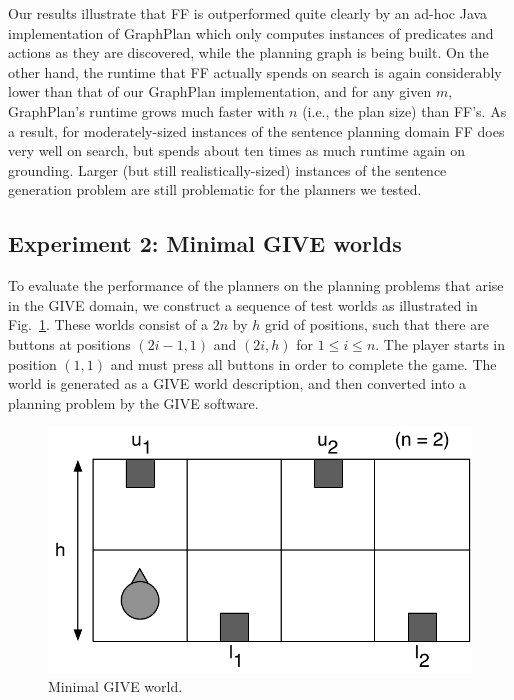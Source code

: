 Our results illustrate that FF is outperformed quite clearly by an ad-hoc
Java implementation of GraphPlan which only computes instances of
predicates and actions as they are discovered, while the planning graph is
being built. On the other hand, the runtime that FF actually spends on
search is again considerably lower than that of our GraphPlan
implementation, and for any given $m$, GraphPlan's runtime grows much
faster with $n$ (i.e., the plan size) than FF's. As a result, for
moderately-sized instances of the sentence planning domain FF does very
well on search, but spends about ten times as much runtime again on
grounding. Larger (but still realistically-sized) instances of the sentence
generation problem are still problematic for the planners we tested.



\subsection{Experiment 2: Minimal GIVE worlds}
\label{sec:exper-2:-minim}

To evaluate the performance of the planners on the planning problems
that arise in the GIVE domain, we construct a sequence of test worlds
as illustrated in Fig.~\ref{fig:give-minimal}.  These worlds consist
of a $2n$ by $h$ grid of positions, such that there are buttons at
positions $(2i-1,1)$ and $(2i,h)$ for $1 \leq i \leq n$.  The player
starts in position $(1,1)$ and must press all buttons in order to
complete the game.  The world is generated as a GIVE world
description, and then converted into a planning problem by the GIVE
software. 

\begin{figure}
  \centering
  \includegraphics[width=0.8\columnwidth]{pic-buttons}
  \caption{Minimal GIVE world.}
  \label{fig:give-minimal}
\end{figure}

